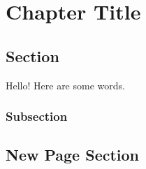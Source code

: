 \chapter{Chapter Title}

\section{Section}

Hello! Here are some words.

\subsection{Subsection}

\clearpage

\section{New Page Section}

